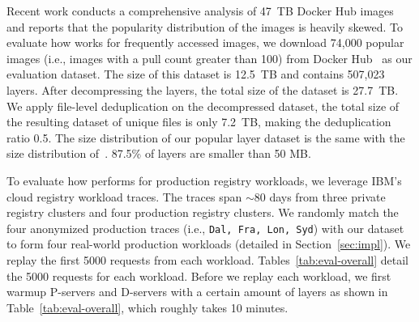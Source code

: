 Recent work \cite{analysisdockergithub} conducts a comprehensive analysis of 47~TB Docker Hub images and reports that the popularity distribution of the images is heavily skewed.
To evaluate how \sysname works for frequently accessed images, we download 74,000 popular images (i.e., images with a pull count greater than 100) from Docker Hub~\cite{docker-hub} as our evaluation dataset. 
The size of this dataset is 12.5~TB and contains 507,023 layers. 
After decompressing the layers, the total size of the dataset is 27.7~TB.
We apply file-level deduplication on the decompressed dataset, 
the total size of the resulting dataset of unique files is only 7.2~TB, making the deduplication ratio 0.5.
The size distribution of our popular layer dataset is the same with the size distribution of~\cite{analysisdockergithub}.
87.5\% of layers are smaller than 50 MB.
  
To evaluate how \sysname performs for production registry workloads, we leverage IBM's cloud registry workload traces\cite{dockerworkload}. 
The traces span $\sim$80 days from three private registry clusters and four production registry clusters. 
We randomly match the four anonymized production traces (i.e., \texttt{Dal, Fra, Lon, Syd}) 
with our dataset to form four real-world production workloads (detailed in Section~\ref{sec:impl}). 
We replay the first 5000 requests from each workload.
Tables~\ref{tab:eval-overall} detail the 5000 requests for each workload.
Before we replay each workload, 
we first warmup P-servers and D-servers with a certain amount of layers 
as shown in Table~\ref{tab:eval-overall}, which roughly takes 10 minutes.




%
%